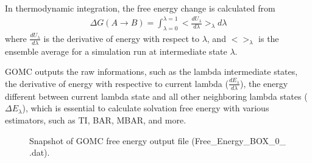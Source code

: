 \documentclass[letterpaper,10pt,english]{sphinxmanual}
\begin{document}
In thermodynamic integration, the free energy change is calculated from
\begin{equation*}
\begin{split}\Delta G(A \rightarrow B) = \int_{\lambda = 0}^{\lambda = 1} \big< \frac{dU_{\lambda}}{d\lambda} \big>_{\lambda} d\lambda\end{split}
\end{equation*}
where \(\frac{dU_{\lambda}}{d\lambda}\) is the derivative of energy with respect
to \(\lambda\), and \(\big< \big>_{\lambda}\) is the ensemble average for a
simulation run at intermediate state \(\lambda\).

GOMC outputs the raw informations, such as the lambda intermediate states,
the derivative of energy with respective to current lambda (\(\frac{dE_{\lambda}}{d\lambda}\)),
the energy different between current lambda state and all other neighboring lambda states
(\(\Delta E_{\lambda}\)), which is essential to calculate solvation free energy
with various estimators, such as TI, BAR, MBAR, and more.

\begin{figure}[htbp]
\centering
\capstart

\noindent{}
\caption{Snapshot of GOMC free energy output file (Free\_Energy\_BOX\_0\_ .dat).}\label{\detokenize{howto:id1}}\end{figure}
\end{document}
